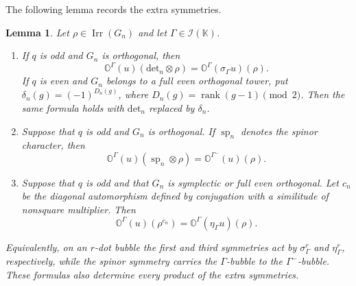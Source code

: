 \documentclass[12pt]{amsart}
\numberwithin{itemcounter}{subsection}
\theoremstyle{plain}
\newtheorem{lemma}[theorem]{Lemma}
\theoremstyle{definition}
\theoremstyle{remark}
\numberwithin{equation}{section}
\def\bbK{\mathbb{K}}
\def\bbO{\mathbb{O}}
\def\calI{\mathcal{I}}
\def\Irr{{\operatorname{Irr}\nolimits}}
\def\sp{{\operatorname{sp}\nolimits}}
\begin{document}
The following lemma records the extra symmetries.
\begin{lemma}\label{lem:extra-symmetries}
Let $\rho\in\Irr(G_n)$ and let $\Gamma\in\calI(\bbK)$.
\begin{enumerate}
\item If $q$ is odd and $G_n$ is orthogonal, then
\[
 \bbO^\Gamma(u)(\mathrm{det}_n\otimes\rho)
 =\bbO^\Gamma(\sigma_\Gamma u)(\rho).
\]
If $q$ is even and $G_n$ belongs to a full even orthogonal tower, put
$\delta_n(g)=(-1)^{D_n(g)}$, where
$D_n(g)=\operatorname{rank}(g-1)\pmod2$.  Then the same formula holds with
$\mathrm{det}_n$ replaced by $\delta_n$.

\item Suppose that $q$ is odd and $G_n$ is orthogonal.  If $\sp_n$ denotes
the spinor character, then
\[
 \bbO^\Gamma(u)(\sp_n\otimes\rho)
 =\bbO^{\Gamma^-}(u)(\rho).
\]

\item Suppose that $q$ is odd and that $G_n$ is symplectic or full even
orthogonal.  Let $c_n$ be the diagonal automorphism defined by conjugation
with a similitude of nonsquare multiplier.  Then
\[
 \bbO^\Gamma(u)(\rho^{c_n})
 =\bbO^\Gamma(\eta_\Gamma u)(\rho).
\]
\end{enumerate}
Equivalently, on an $r$-dot bubble the first and third symmetries act by
$\sigma_\Gamma^r$ and $\eta_\Gamma^r$, respectively, while the spinor
symmetry carries the $\Gamma$-bubble to the $\Gamma^-$-bubble.  These
formulas also determine every product of the extra symmetries.
\end{lemma}
\end{document}
